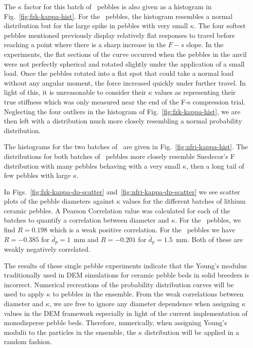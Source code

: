 The $\kappa$ factor for this batch of \lis~pebbles is also given as a histogram in Fig.~\ref{fig:fzk-kappa-hist}. For the \lis~pebbles, the histogram resembles a normal distribution but for the large spike in pebbles with very small $\kappa$. The four softest pebbles mentioned previously display relatively flat responses to travel before reaching a point where there is a sharp increase in the $F-s$ slope. In the experiments, the flat sections of the curve occurred when the pebbles in the anvil were not perfectly spherical and rotated slightly under the application of a small load. Once the pebbles rotated into a flat spot that could take a normal load without any angular moment, the force increased quickly under further travel. In light of this, it is unreasonable to consider their $\kappa$ values as representing their true stiffness which was only measured near the end of the F-s compression trial. Neglecting the four outliers in the histogram of Fig.~\ref{fig:fzk-kappa-hist}, we are then left with a distribution much more closely resembling a normal probability distribution.

The histograms for the two batches of \lit~are given in Fig.~\ref{fig:nfri-kappa-hist}. The distributions for both batches of \lit~pebbles more closely resemble Snedecor's F distribution with many pebbles behaving with a very small $\kappa$, then a long tail of few pebbles with large $\kappa$.

In Figs.~\ref{fig:fzk-kappa-dp-scatter} and~\ref{fig:nfri-kappa-dp-scatter} we see scatter plots of the pebble diameters against $\kappa$ values for the different batches of lithium ceramic pebbles. A Pearson Correlation value was calculated for each of the batches to quantify a correlation between diameter and $\kappa$. For the \lis~pebbles, we find $R = 0.198$ which is a weak positive correlation. For the \lit~pebbles we have $R = -0.385$ for $\bar{d}_p = 1$~mm and $R = -0.201$ for $\bar{d}_p = 1.5$~mm. Both of these are weakly negatively correlated. 

The results of these single pebble experiments indicate that the Young's modulus traditionally used in DEM simulations for ceramic pebble beds in solid breeders is incorrect. Numerical recreations of the probability distribution curves will be used to apply $\kappa$ to pebbles in the ensemble. From the weak correlations between diameter and $\kappa$, we are free to ignore any diameter dependence when assigning $\kappa$ values in the DEM framework especially in light of the current implementation of monodisperse pebble beds. Therefore, numerically, when assigning Young's modulii to the particles in the ensemble, the $\kappa$ distribution will be applied in a random fashion.





